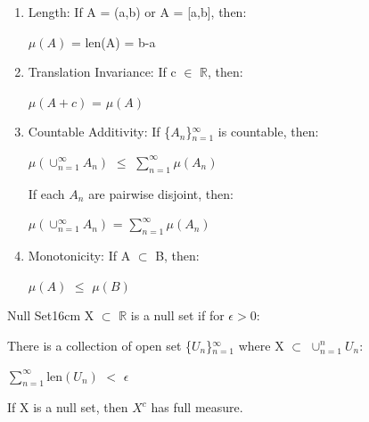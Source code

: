     \begin{enumerate}[label=(\alph*), leftmargin=2cm, itemsep=0.1cm]
        \item {\color{lgreen} Length}:
            If A = (a,b) or A = [a,b], then:

            \hspace{0.5cm}
            $\mu(A)$ = len(A) = b-a

        \item {\color{lgreen} Translation Invariance}:
            If c $\in$ $\mathbb{R}$, then:
            
            \hspace{0.5cm}
            $\mu(A+c)$ = $\mu(A)$

        \item {\color{lgreen} Countable Additivity}:
            If \{$A_n$\}$_{n=1}^{\infty}$ is countable, then:

            \hspace{0.5cm}
            $\mu(\cup_{n=1}^{\infty} A_n)$
            $\leq$ $\sum_{n=1}^{\infty} \mu(A_n)$

            If each $A_n$ are pairwise disjoint, then:

            \hspace{0.5cm}
            $\mu(\cup_{n=1}^{\infty} A_n)$
            = $\sum_{n=1}^{\infty} \mu(A_n)$

        \item {\color{lgreen} Monotonicity}:
            If A $\subset$ B, then:

            \hspace{0.5cm}
            $\mu(A)$ $\leq$ $\mu(B)$
    \end{enumerate}

    \newpage



    \begin{definition}{Null Set}{16cm}
        X $\subset$ $\mathbb{R}$ is a {\color{lblue} null set}
        if for $\epsilon > 0$:

        \hspace{0.5cm}
        There is a collection of open set \{$U_n$\}$_{n=1}^{\infty}$
        where X $\subset$ $\cup_{n=1}^n U_n$:

        \hspace{1cm}
        $\sum_{n=1}^{\infty} \text{len}(U_n)$ $<$ $\epsilon$

        If X is a null set, then $X^c$ has full measure.
    \end{definition}

